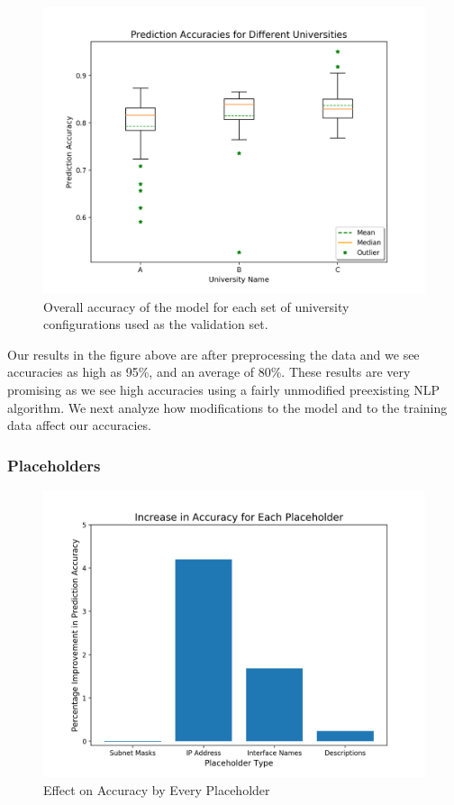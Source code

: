 \begin{figure}[H]
	\centering
	\includegraphics[width=\textwidth]{uni_analysis.png}
	\caption{Overall accuracy of the model for each set of university configurations used as the validation set.}
\end{figure}

 Our results in the figure above are after preprocessing the data and we see accuracies as high as 95\%, and an average of 80\%. These results are very promising as we see high accuracies using a fairly unmodified preexisting NLP algorithm. We next analyze how modifications to the model and to the training data affect our accuracies.

\subsubsection{Placeholders}

\begin{figure}[H]
	\centering
	\includegraphics[width=\textwidth]{placeholders.png}
	\caption{Effect on Accuracy by Every Placeholder}
\end{figure}

